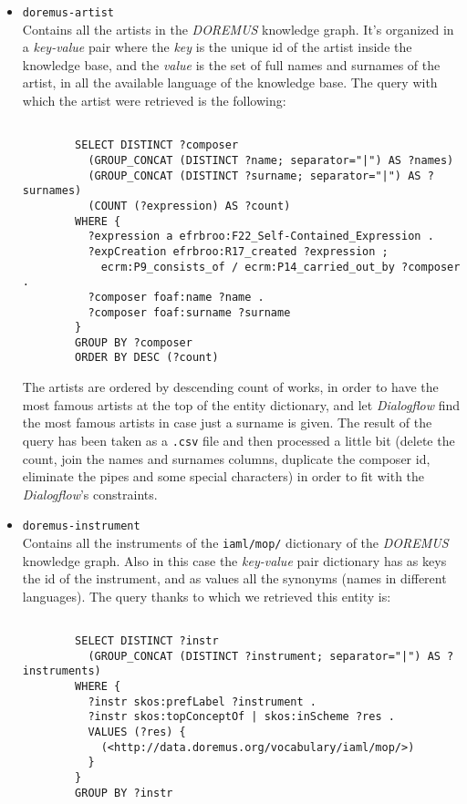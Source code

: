 	\begin{itemize}
		\item \texttt{doremus-artist}\\
		Contains all the artists in the \textit{DOREMUS} knowledge graph. It's organized in a \textit{key-value} pair where the \textit{key} is the unique id of the artist inside the knowledge base, and the \textit{value} is the set of full names and surnames of the artist, in all the available language of the knowledge base.
		The query with which the artist were retrieved is the following:
		\begin{lstlisting}

		SELECT DISTINCT ?composer
		  (GROUP_CONCAT (DISTINCT ?name; separator="|") AS ?names)
		  (GROUP_CONCAT (DISTINCT ?surname; separator="|") AS ?surnames)
		  (COUNT (?expression) AS ?count)
		WHERE {
		  ?expression a efrbroo:F22_Self-Contained_Expression .
		  ?expCreation efrbroo:R17_created ?expression ;
		    ecrm:P9_consists_of / ecrm:P14_carried_out_by ?composer .
		  ?composer foaf:name ?name .
		  ?composer foaf:surname ?surname 
		}
		GROUP BY ?composer
		ORDER BY DESC (?count)
		\end{lstlisting}
		The artists are ordered by descending count of works, in order to have the most famous artists at the top of the entity dictionary, and let \textit{Dialogflow} find the most famous artists in case just a surname is given. The result of the query has been taken as a \texttt{.csv} file and then processed a little bit (delete the count, join the names and surnames columns, duplicate the composer id, eliminate the pipes and some special characters) in order to fit with the \textit{Dialogflow}'s constraints.
		
		\item \texttt{doremus-instrument}\\
		Contains all the instruments of the \texttt{iaml/mop/} dictionary of the \textit{DOREMUS} knowledge graph. Also in this case the \textit{key-value} pair dictionary has as keys the id of the instrument, and as values all the synonyms (names in different languages). The query thanks to which we retrieved this entity is:
		\begin{lstlisting}
		
		SELECT DISTINCT ?instr
		  (GROUP_CONCAT (DISTINCT ?instrument; separator="|") AS ?instruments)
		WHERE {
		  ?instr skos:prefLabel ?instrument .
		  ?instr skos:topConceptOf | skos:inScheme ?res .
		  VALUES (?res) {
		    (<http://data.doremus.org/vocabulary/iaml/mop/>)
		  }
		}
		GROUP BY ?instr
		\end{lstlisting}
		

\end{itemize}
